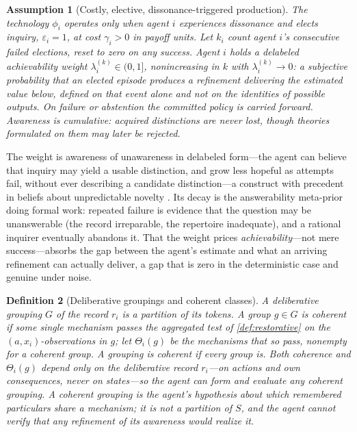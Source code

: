 \documentclass[11pt]{article}
\newtheorem{assumption}{Assumption}[section]
\newtheorem{definition}[assumption]{Definition}
\theoremstyle{definition}
\begin{document}
\begin{assumption}[Costly, elective, dissonance-triggered production]
\label{ass:elective}
The technology $\phi_i$ operates only when agent $i$ experiences dissonance
and elects inquiry, $\varepsilon_i=1$, at cost $\gamma_i>0$ in payoff units.
Let $k_i$ count agent $i$'s consecutive failed elections, reset to zero on any
success.  Agent $i$ holds a \emph{delabeled achievability weight}
$\lambda_i^{(k)}\in(0,1]$, nonincreasing in $k$ with $\lambda_i^{(k)}\to0$: a
subjective probability that an elected episode produces a refinement
\emph{delivering the estimated value below}, defined on that event alone and
not on the identities of possible outputs.  On failure or abstention the
committed policy is carried forward.  Awareness is cumulative: acquired
distinctions are never lost, though theories formulated on them may later be
rejected.
\end{assumption}

The weight is awareness of unawareness in delabeled form---the agent can
believe that inquiry may yield a usable distinction, and grow less hopeful as
attempts fail, without ever describing a candidate distinction---a construct
with precedent in beliefs about unpredictable novelty
\citep{Schipper2025,KarniViero2017}.  Its decay is the answerability meta-prior
doing formal work: repeated failure is evidence that the question may be
unanswerable (the record irreparable, the repertoire inadequate), and a
rational inquirer eventually abandons it.  That the weight prices
\emph{achievability}---not mere success---absorbs the gap between the agent's
estimate and what an arriving refinement can actually deliver, a gap that is
zero in the deterministic case and genuine under noise.

\begin{definition}[Deliberative groupings and coherent classes]
\label{def:pinned}
A \emph{deliberative grouping} $G$ of the record $r_i$ is a partition of its
tokens.  A group $g\in G$ is \emph{coherent} if some single mechanism passes
the aggregated test of \cref{def:restorative} on the $(a,x_i)$-observations in
$g$; let $\Theta_i(g)$ be the mechanisms that so pass, nonempty for a coherent
group.  A grouping is coherent if every group is.  Both coherence and
$\Theta_i(g)$ depend only on the deliberative record $r_i$---on actions and
own consequences, never on states---so the agent can form and evaluate any
coherent grouping.  A coherent grouping is the agent's hypothesis about which
remembered particulars share a mechanism; it is not a partition of $S$, and
the agent cannot verify that any refinement of its awareness would realize it.
\end{definition}
\end{document}
